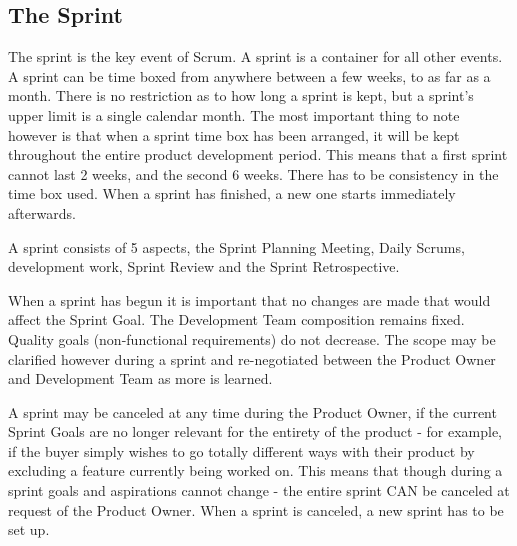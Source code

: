 \subsection{The Sprint}

The sprint is the key event of Scrum. 
A sprint is a container for all other events.
A sprint can be time boxed from anywhere between a few weeks, to as far as a month. 
There is no restriction as to how 
long a sprint is kept, but a sprint's upper limit is a single calendar 
month\cite{scrumguide11}. The most important thing to note however is that 
when a sprint time box has been arranged, it will be kept throughout the 
entire product development period\cite{scrumguide11}. This means that a 
first sprint cannot last 2 weeks, and the second 6 weeks. There has to be 
consistency in the time box used\cite{scrumguide11}. When a sprint has 
finished, a new one starts immediately afterwards\cite{scrumguide11}.


A sprint consists of 5 aspects, the Sprint Planning Meeting, Daily Scrums, 
development work, Sprint Review and the Sprint Retrospective\cite{scrumguide11}. 


When a sprint has begun it is important that no changes are made that would 
affect the Sprint Goal\cite{scrumguide11}. The Development Team composition 
remains fixed. Quality goals (non-functional requirements) do not 
decrease\cite{scrumguide11}. The scope may be clarified however during a sprint and 
re-negotiated between the Product Owner and Development Team as more is 
learned\cite{scrumguide11}. 


A sprint may be canceled at any time during the Product Owner, if the current 
Sprint Goals are no longer relevant for the entirety of the product - for 
example, if the buyer simply wishes to go totally different ways with their 
product by excluding a feature currently being worked on\cite{scrumguide11}. 
This means that though during a sprint goals and aspirations cannot change - 
the entire sprint CAN be canceled at request of the Product 
Owner\cite{scrumguide11}. When a sprint is canceled, a new sprint has to be 
set up\cite{scrumguide11}.



